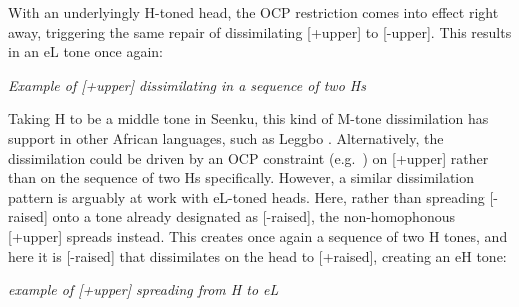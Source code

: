 \documentclass[output=paper]{langsci/langscibook}
\begin{document}
With an underlyingly H-toned head, the OCP restriction comes into effect right away, triggering the same repair of dissimilating [+upper] to [-upper]. This results in an eL tone once again:

\ea\label{ex:mcpherson:24} {\it Example of [+upper] dissimilating in a sequence of two Hs} \\
\z

Taking H to be a middle tone in Seenku, this kind of M-tone dissimilation has support in other African languages, such as Leggbo \citep{Paster03}. Alternatively, the dissimilation could be driven by an OCP constraint (e.g.\ \citealt{McCarthy86}) on [+upper] rather than on the sequence of two Hs specifically. However, a similar dissimilation pattern is arguably at work with eL-toned heads. Here, rather than spreading [-raised] onto a tone already designated as [-raised], the non-homophonous [+upper] spreads instead. This creates once again a sequence of two H tones, and here it is [-raised] that dissimilates on the head to [+raised], creating an eH tone:

\ea\label{ex:mcpherson:25} {\it example of [+upper] spreading from H to eL} \\
\z
\end{document}
